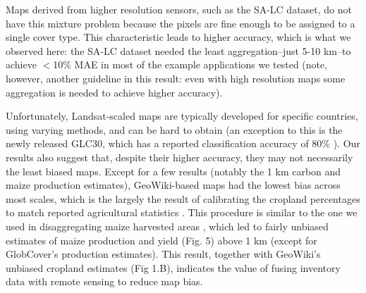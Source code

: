 \documentclass{pnastwo2}
\begin{document}
\begin{article}
Maps derived from higher resolution sensors, such as the SA-LC dataset, do not have this mixture problem because the pixels are fine enough to be assigned to a single cover type. This characteristic leads to higher accuracy, which is what we observed here: the SA-LC dataset needed the least aggregation--just 5-10 km--to achieve $<$10\% MAE in most of the example applications we tested (note, however, another guideline in this result: even with high resolution maps some aggregation is needed to achieve higher accuracy).


Unfortunately, Landsat-scaled maps are typically developed for specific countries, using varying methods, and can be hard to obtain (an exception to this is the newly released GLC30, which has a reported classification accuracy of 80\% \cite{chen_global_2015}). Our results also suggest that, despite their higher accuracy, they may not necessarily the least biased maps. Except for a few results (notably the 1 km carbon and maize production estimates), GeoWiki-based maps had the lowest bias across most scales, which is the largely the result of calibrating the cropland percentages to match reported agricultural statistics \cite{fritz_cropland_2011,fritz_mapping_2015}. This procedure is similar to the one we used in disaggregating maize harvested areas \cite{ramankutty_farming_2008, monfreda_farming_2008}, which led to fairly unbiased estimates of maize production and yield (Fig. 5) above 1 km (except for GlobCover's production estimates). This result, together with GeoWiki's unbiased cropland estimates (Fig 1.B), indicates the value of fusing inventory data with remote sensing to reduce map bias. 



\end{article}
\end{document}
